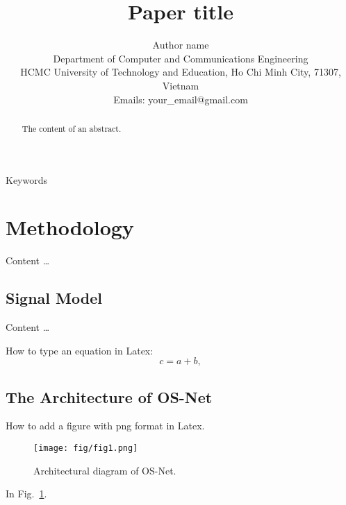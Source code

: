 \documentclass[conference]{IEEEtran}
\begin{document}


\title{Paper title}


\author{\fontsize{10.5}{14} Author name\\
Department of Computer and Communications Engineering\\
HCMC University of Technology and Education, Ho Chi Minh City, 71307, Vietnam\\
Emails: \textrm{your\_email@gmail.com}}


\maketitle

\begin{abstract}
The content of an abstract.

\end{abstract}

\begin{IEEEkeywords}
Keywords
\end{IEEEkeywords}

\section{Methodology}
Content \dots

\subsection{Signal Model}
Content \dots

How to type an equation in Latex:
\begin{equation}
c = a + b,
\end{equation}


\subsection{The Architecture of OS-Net}
How to add a figure with png format in Latex.
\begin{figure}[!t]
	\centering
	\texttt{[image: fig/fig1.png]}
	\caption{Architectural diagram of OS-Net.}
    \label{fig01}
\end{figure}
In Fig.~\ref{fig01}.
\end{document}
